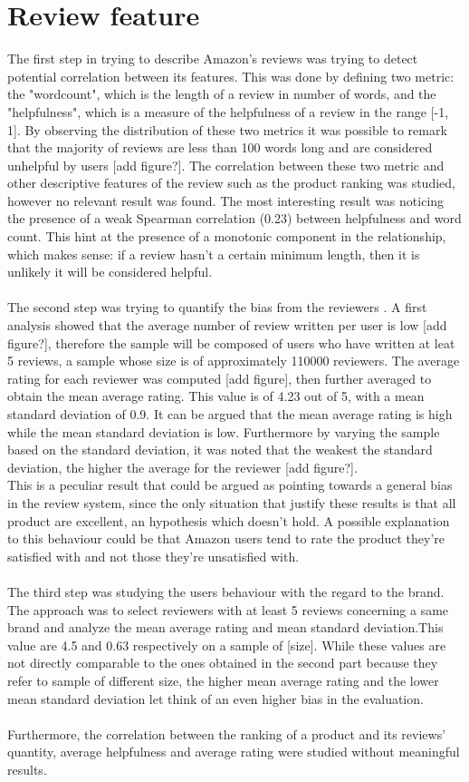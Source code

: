 \documentclass[11pt]{article}
\begin{document}
\section{Review feature}
    The first step in trying to describe Amazon's reviews was trying to detect potential correlation between its features. This was done by defining two metric: the "wordcount", which is 
  the length of a review in number of words, and the "helpfulness", which is a measure of the helpfulness of a review in the range [-1, 1]. By observing the distribution of these two metrics it was possible to remark that the majority of reviews are less than 100 words long and are considered unhelpful by users [add figure?]. The correlation between these two metric and  other descriptive features of the review such as the product ranking was studied, however no relevant result was found. The most interesting result was noticing the presence of a weak Spearman correlation (0.23) between helpfulness and word count. This hint at the presence of a monotonic component in the relationship, which makes sense: if a review hasn't a certain minimum length, then it is unlikely it will be considered helpful.\\\\
The second step was trying to quantify the bias from the reviewers . A first analysis showed that the average number of review written per user is low [add figure?], therefore the sample will be composed of users who have written at leat 5 reviews, a sample whose size is of approximately 110000 reviewers. The average rating for each reviewer was computed [add figure], then further averaged to obtain the mean average rating. This value is of 4.23 out of 5, with a mean standard deviation of 0.9. It can be argued that the mean average rating is high while the mean standard deviation is low. Furthermore by varying the sample based on the standard deviation, it was noted that the weakest the standard deviation, the higher the average for the reviewer [add figure?].\\ This is a peculiar result that could be argued as pointing towards a general bias in the review system, since the only situation that justify these results is that all product are excellent, an hypothesis which doesn't hold. A possible explanation to this behaviour could be that Amazon users  tend to rate the product they're satisfied with and not those they're unsatisfied with.\\\\
The third step was studying the users behaviour with the regard to the brand. The approach was to select reviewers with at least 5 reviews concerning a same brand and analyze the mean average rating and mean standard deviation.This value are 4.5 and 0.63 respectively on a sample of [size]. While these values are not directly comparable to the ones obtained in the second part because they refer to sample of different size, the higher mean average rating and the lower mean standard deviation let think of an even higher bias in the evaluation.\\\\
Furthermore, the correlation between the ranking of a product and its reviews' quantity, average helpfulness and average rating were studied without meaningful results.
\end{document}
